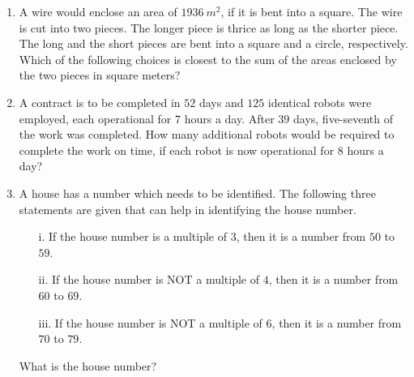 \documentclass[journal,12pt,onecolumn]{IEEEtran}
\theoremstyle{remark}
\begin{document}
\begin{enumerate}
\begin{enumerate}
\end{enumerate}

\item A wire would enclose an area of $1936~m^2$, if it is bent into a square. The wire is cut into two pieces. The longer piece is thrice as long as the shorter piece. The long and the short pieces are bent into a square and a circle, respectively. Which of the following choices is closest to the sum of the areas enclosed by the two pieces in square meters?

\hfill{}

\begin{enumerate}
\end{enumerate}

\item A contract is to be completed in $52$ days and $125$ identical robots were employed, each operational for $7$ hours a day. After $39$ days, five-seventh of the work was completed. How many additional robots would be required to complete the work on time, if each robot is now operational for $8$ hours a day?

\hfill{}

\begin{enumerate}
\end{enumerate}

\item A house has a number which needs to be identified. The following three statements are given that can help in identifying the house number.
\begin{enumerate}
    \item[i.] If the house number is a multiple of $3$, then it is a number from $50$ to $59$.
    \item[ii.] If the house number is NOT a multiple of $4$, then it is a number from $60$ to $69$.
    \item[iii.] If the house number is NOT a multiple of $6$, then it is a number from $70$ to $79$.
\end{enumerate}
What is the house number?


\end{enumerate}
\end{document}
